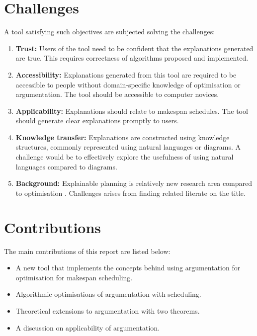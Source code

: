 \section{Challenges}

A tool satisfying such objectives are subjected solving the challenges:
\begin{enumerate}
	\item\textbf{Trust:} Users of the tool need to be confident that the explanations generated are true. This requires correctness of algorithms proposed and implemented.
	\item\textbf{Accessibility:} Explanations generated from this tool are required to be accessible to people without domain-specific knowledge of optimisation or argumentation. The tool should be accessible to computer novices.
	\item\textbf{Applicability:} Explanations should relate to makespan schedules. The tool should generate clear explanations promptly to users.
	\item\textbf{Knowledge transfer:} Explanations are constructed using knowledge structures, commonly represented using natural languages or diagrams. A challenge would be to effectively explore the usefulness of using natural languages compared to diagrams.
	\item\textbf{Background:} Explainable planning is relatively new research area compared to optimisation \cite{pe}. Challenges arises from finding related literate on the title.
\end{enumerate}

\section{Contributions}

The main contributions of this report are listed below:
\begin{itemize}
	\item A new tool \emph{\toolname} that implements the concepts behind using argumentation for optimisation for makespan scheduling.
	\item Algorithmic optimisations of argumentation with scheduling.
	\item Theoretical extensions to argumentation with two theorems.
	\item A discussion on applicability of argumentation.
\end{itemize}
